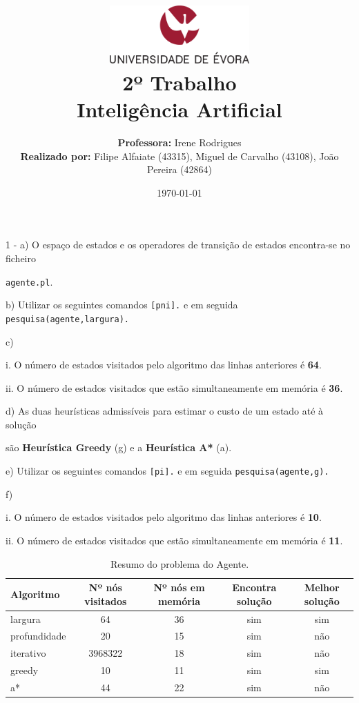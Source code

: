 \documentclass[11pt]{article}
\title
{
    \includegraphics[width=0.4\textwidth]{imgs/university.png}
    \\[0.1cm]
    \textbf{2º Trabalho} \\
    Inteligência Artificial
}
\author
{
    \textbf{Professora:} Irene Rodrigues \\
    \textbf{Realizado por:} Filipe Alfaiate (43315), Miguel de Carvalho (43108), João Pereira (42864) 
}
\date{\today}
\begin{document}
\maketitle

1 - a) O espaço de estados e os operadores de transição de estados encontra-se no ficheiro

\hspace{1,1cm}\verb|agente.pl|.

\hspace{0,6cm}b) Utilizar os seguintes comandos \verb|[pni].| e em seguida 
\verb|pesquisa(agente,largura).|

\hspace{0,6cm}c)

\hspace{1cm}i. O número de estados visitados pelo algoritmo das linhas anteriores é \textbf{64}.

\hspace{1cm}ii. O número de estados visitados que estão simultaneamente em memória é \textbf{36}.

\hspace{0,6cm}d) As duas heurísticas admissíveis para estimar o custo de um estado até à solução

\hspace{1,1cm}são \textbf{Heurística Greedy} (g) e a \textbf{Heurística A*} (a).

\hspace{0,6cm}e) Utilizar os seguintes comandos \verb|[pi].| e em seguida 
\verb|pesquisa(agente,g).|

\hspace{0,6cm}f)

\hspace{1cm}i. O número de estados visitados pelo algoritmo das linhas anteriores é \textbf{10}.

\hspace{1cm}ii. O número de estados visitados que estão simultaneamente em memória é \textbf{11}.


\begin{table}[h!]
    \begin{center}
        \begin{tabular}{l|c|c|c|c}
            \textbf{Algoritmo} & \textbf{Nº nós visitados} & \textbf{Nº nós em memória} & \textbf{Encontra solução} & \textbf{Melhor solução}\\
            \hline
            largura      & 64        & 36 & sim & sim \\
            \hline
            profundidade & 20        & 15 & sim & não \\
            \hline
            iterativo    & 3968322   & 18 & sim & não \\
            \hline
            greedy       & 10        & 11  & sim & sim \\
            \hline
            a*           & 44        & 22 & sim & não
        \end{tabular}
        \caption{Resumo do problema do Agente.}
        \label{tab:table1}
    \end{center}
\end{table}
\end{document}
